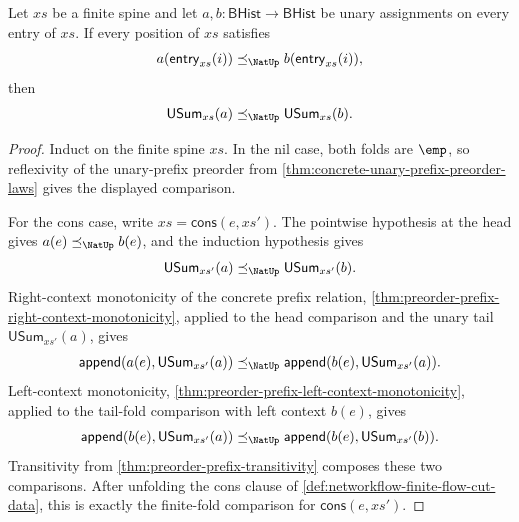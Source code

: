 \begin{lemma}
\label{lem:networkflow-unary-finite-fold-monotonicity}
Let $xs$ be a finite spine and let $a,b:\mathsf{BHist}\to\mathsf{BHist}$ be unary assignments on every entry of $xs$. If every position of $xs$ satisfies
$$
a(\mathsf{entry}_{xs}(i))\preceq_{\NatUp}b(\mathsf{entry}_{xs}(i)),
$$
then
$$
\mathsf{USum}_{xs}(a)\preceq_{\NatUp}\mathsf{USum}_{xs}(b).
$$
\end{lemma}
\begin{proof}
Induct on the finite spine $xs$. In the nil case, both folds are $\emp$, so reflexivity of the unary-prefix preorder from \autoref{thm:concrete-unary-prefix-preorder-laws} gives the displayed comparison.

For the cons case, write $xs=\mathsf{cons}(e,xs')$. The pointwise hypothesis at the head gives $a(e)\preceq_{\NatUp}b(e)$, and the induction hypothesis gives
$$
\mathsf{USum}_{xs'}(a)\preceq_{\NatUp}\mathsf{USum}_{xs'}(b).
$$
Right-context monotonicity of the concrete prefix relation, \autoref{thm:preorder-prefix-right-context-monotonicity}, applied to the head comparison and the unary tail $\mathsf{USum}_{xs'}(a)$, gives
$$
\mathsf{append}(a(e),\mathsf{USum}_{xs'}(a))
\preceq_{\NatUp}
\mathsf{append}(b(e),\mathsf{USum}_{xs'}(a)).
$$
Left-context monotonicity, \autoref{thm:preorder-prefix-left-context-monotonicity}, applied to the tail-fold comparison with left context $b(e)$, gives
$$
\mathsf{append}(b(e),\mathsf{USum}_{xs'}(a))
\preceq_{\NatUp}
\mathsf{append}(b(e),\mathsf{USum}_{xs'}(b)).
$$
Transitivity from \autoref{thm:preorder-prefix-transitivity} composes these two comparisons. After unfolding the cons clause of \autoref{def:networkflow-finite-flow-cut-data}, this is exactly the finite-fold comparison for $\mathsf{cons}(e,xs')$.
\end{proof}

